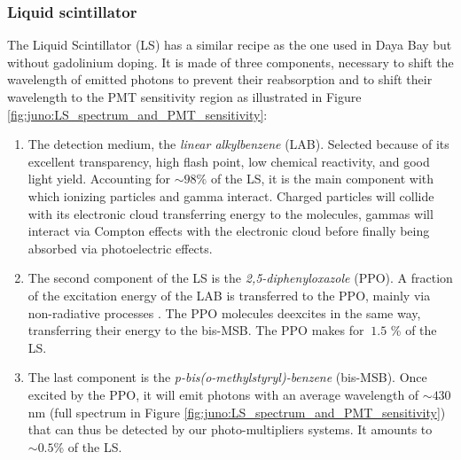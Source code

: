 \documentclass[../main.tex]{subfiles}
\begin{document}
\subsubsection{Liquid scintillator}
\label{sec:juno:LS}

The Liquid Scintillator (LS) has a similar recipe as the one used in Daya Bay \cite{bay_optimization_2020} but without gadolinium doping. It is made of three components, necessary to shift the wavelength of emitted photons to prevent their reabsorption and to shift their wavelength to the PMT sensitivity region as illustrated in Figure \ref{fig:juno:LS_spectrum_and_PMT_sensitivity}:
\begin{enumerate}
  \item The detection medium, the \textit{linear alkylbenzene} (LAB). Selected because of its excellent transparency, high flash point, low chemical reactivity, and good light yield. Accounting for $\sim 98\%$ of the LS, it is the main component with which ionizing particles and gamma interact. Charged particles will collide with its electronic cloud transferring energy to the molecules, gammas will interact via Compton effects with the electronic cloud before finally being absorbed via photoelectric effects.
  \item The second component of the LS is the \textit{2,5-diphenyloxazole} (PPO). A fraction of the excitation energy of the LAB is transferred to the PPO, mainly via non-radiative processes \cite{birks_chapter_1964}. The PPO molecules deexcites in the same way, transferring their energy to the bis-MSB. The PPO makes for $~1.5$ \% of the LS.
  \item The last component is the \textit{p-bis(o-methylstyryl)-benzene} (bis-MSB). Once excited by the PPO, it will emit photons with an average wavelength of $\sim430$ nm (full spectrum in Figure \ref{fig:juno:LS_spectrum_and_PMT_sensitivity}) that can thus be detected by our photo-multipliers systems. It amounts to $\sim 0.5$\% of the LS.
\end{enumerate}
\end{document}

